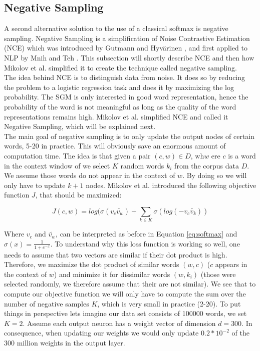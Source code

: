 \subsection{Negative Sampling}
A second alternative solution to the use of a classical softmax is negative sampling. Negative Sampling is a simplification of Noise Contrastive Estimation (NCE) which was introduced by Gutmann and Hyv{\"a}rinen \cite{nce-original}, and first applied to NLP by Mnih and Teh \cite{mnih}. This subsection will shortly describe NCE and then how Mikolov et al. \cite{mikolov2} simplified it to create the technique called negative sampling. \\ The idea behind NCE is to distinguish data from noise. It does so by reducing the problem to a logistic regression task and does it by maximizing the log probability. The SGM is only interested in good word representation, hence the probability of the word is not meaningful as long as the quality of the word representations remains high. Mikolov et al. \cite{mikolov2} simplified NCE and called it Negative Sampling, which will be explained next.\\
The main goal of negative sampling is to only update the output nodes of certain words, 5-20 in practice. This will obviously save an enormous amount of computation time. The idea is that given a pair $(c,w) \in D$, wh$w$ ere $c$ is a word in the context window of we select $K$ random words $k_i$ from the corpus data $D$. We assume those words do not appear in the context of $w$. By doing so we will only have to update $k+1$ nodes. Mikolov et al. \cite{mikolov2} introduced the following objective function $J$, that should be maximized:

\begin{equation}
J(c,w)= log(\sigma(v_c \tilde{v_w } ) + \sum_{k\in K} \sigma(log(-v_c \tilde{v_k} ))
\end{equation}\label{eq:obj_neg_samples}

Where $v_c$ and $\tilde{v_w }$, can be interpreted as before in Equation \ref{eq:softmax} and $\sigma(x) = \frac{1}{1+e^{-x}}$. To  understand why this loss function is working so well, one needs to assume that two vectors are similar if their dot product is high. Therefore, we maximize the dot product of similar words $(w,c)$ ($c$ appears in the context of $w$) and minimize it for dissimilar words $(w,k_i)$ (those were selected randomly, we therefore assume that their are not similar).
We see that to compute our objective function we will only have to compute the sum over the number of negative samples $K$, which is very small in practice (2-20). To put things in perspective lets imagine our data set consists of 100000 words, we set $K=2$. Assume each output neuron has a weight vector of dimension $d = 300$. In consequence, when updating our weights we would only update $0.2*10^{-2}$ of the 300 million weights in the output layer.

